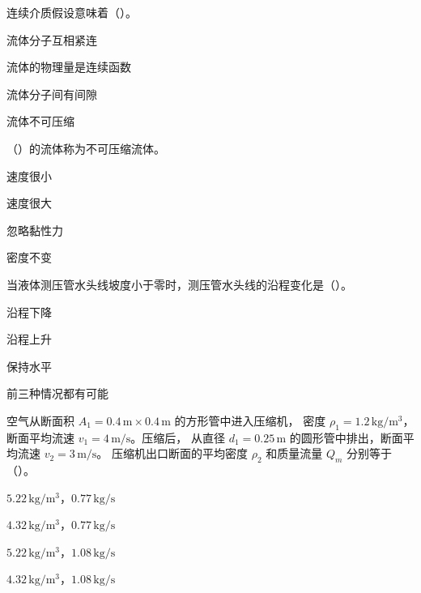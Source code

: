 \begin{ti}
  \item 连续介质假设意味着（\quad）。\hfill{}
  \begin{choices}
    \item 流体分子互相紧连
    \item 流体的物理量是连续函数
    \item 流体分子间有间隙
    \item 流体不可压缩
  \end{choices}

  \item （\quad）的流体称为不可压缩流体。\hfill{}
  \begin{choices}
    \item 速度很小
    \item 速度很大
    \item 忽略黏性力
    \item 密度不变
  \end{choices}

  \item 当液体测压管水头线坡度小于零时，测压管水头线的沿程变化是（\quad）。
  \hfill{}
  \begin{choices}
    \item 沿程下降
    \item 沿程上升
    \item 保持水平
    \item 前三种情况都有可能
  \end{choices}

  \item 空气从断面积 $A_1=0.4\,\mathrm{m}\times0.4\,\mathrm{m}$ 的方形管中进入压缩机，
  密度 $\rho_1=1.2\,\mathrm{kg/m^3}$，断面平均流速 $v_1=4\,\mathrm{m/s}$。压缩后，
  从直径 $d_1=0.25\,\mathrm{m}$ 的圆形管中排出，断面平均流速 $v_2=3\,\mathrm{m/s}$。
  压缩机出口断面的平均密度 $\rho_2$ 和质量流量 $Q_m$ 分别等于（\quad）。
  \hfill{}
  \begin{choices}
    \item $5.22\,\mathrm{kg/m^3}$，$0.77\,\mathrm{kg/s}$
    \item $4.32\,\mathrm{kg/m^3}$，$0.77\,\mathrm{kg/s}$
    \item $5.22\,\mathrm{kg/m^3}$，$1.08\,\mathrm{kg/s}$
    \item $4.32\,\mathrm{kg/m^3}$，$1.08\,\mathrm{kg/s}$
  \end{choices}


\end{ti}
